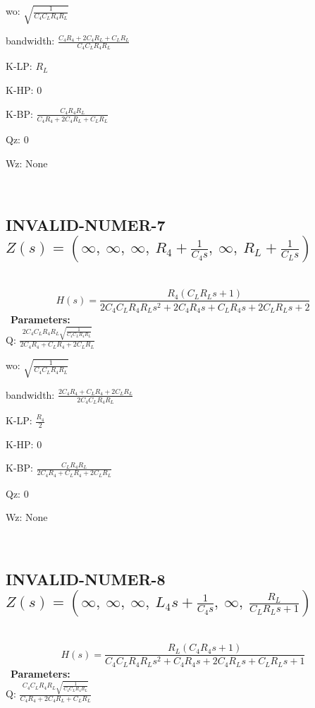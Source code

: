 \documentclass{article}
\begin{document}
wo: $\sqrt{\frac{1}{C_{4} C_{L} R_{4} R_{L}}}$\ 

bandwidth: $\frac{C_{4} R_{4} + 2 C_{4} R_{L} + C_{L} R_{L}}{C_{4} C_{L} R_{4} R_{L}}$\ 

K-LP: $R_{L}$\ 

K-HP: $0$\ 

K-BP: $\frac{C_{4} R_{4} R_{L}}{C_{4} R_{4} + 2 C_{4} R_{L} + C_{L} R_{L}}$\ 

Qz: $0$\ 

Wz: $\text{None}$\ 

\ 

\subsection{INVALID-NUMER-7 $Z(s) = \left( \infty, \  \infty, \  \infty, \  R_{4} + \frac{1}{C_{4} s}, \  \infty, \  R_{L} + \frac{1}{C_{L} s}\right)$ } \ 
\textbf{\[H(s) = \frac{R_{4} \left(C_{L} R_{L} s + 1\right)}{2 C_{4} C_{L} R_{4} R_{L} s^{2} + 2 C_{4} R_{4} s + C_{L} R_{4} s + 2 C_{L} R_{L} s + 2}\] } \ 
\textbf{Parameters:}\\ 

Q: $\frac{2 C_{4} C_{L} R_{4} R_{L} \sqrt{\frac{1}{C_{4} C_{L} R_{4} R_{L}}}}{2 C_{4} R_{4} + C_{L} R_{4} + 2 C_{L} R_{L}}$\ 

wo: $\sqrt{\frac{1}{C_{4} C_{L} R_{4} R_{L}}}$\ 

bandwidth: $\frac{2 C_{4} R_{4} + C_{L} R_{4} + 2 C_{L} R_{L}}{2 C_{4} C_{L} R_{4} R_{L}}$\ 

K-LP: $\frac{R_{4}}{2}$\ 

K-HP: $0$\ 

K-BP: $\frac{C_{L} R_{4} R_{L}}{2 C_{4} R_{4} + C_{L} R_{4} + 2 C_{L} R_{L}}$\ 

Qz: $0$\ 

Wz: $\text{None}$\ 

\ 

\subsection{INVALID-NUMER-8 $Z(s) = \left( \infty, \  \infty, \  \infty, \  L_{4} s + \frac{1}{C_{4} s}, \  \infty, \  \frac{R_{L}}{C_{L} R_{L} s + 1}\right)$ } \ 
\textbf{\[H(s) = \frac{R_{L} \left(C_{4} R_{4} s + 1\right)}{C_{4} C_{L} R_{4} R_{L} s^{2} + C_{4} R_{4} s + 2 C_{4} R_{L} s + C_{L} R_{L} s + 1}\] } \ 
\textbf{Parameters:}\\ 

Q: $\frac{C_{4} C_{L} R_{4} R_{L} \sqrt{\frac{1}{C_{4} C_{L} R_{4} R_{L}}}}{C_{4} R_{4} + 2 C_{4} R_{L} + C_{L} R_{L}}$\ 
\end{document}
